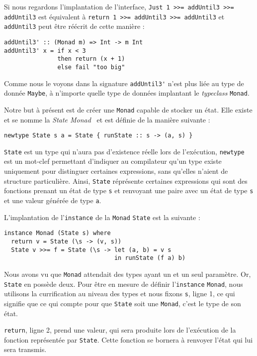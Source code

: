 \documentclass{llncs}
\begin{document}
Si nous regardons l'implantation de l'interface, \lstinline{Just 1 >>= addUntil3 >>= addUntil3}
est équivalent à \lstinline{return 1 >>= addUntil3 >>= addUntil3} et \lstinline{addUntil3}
peut être réécrit de cette manière :
\begin{lstlisting}
addUntil3' :: (Monad m) => Int -> m Int
addUntil3' x = if x < 3
               then return (x + 1)
               else fail "too big"
\end{lstlisting}

Comme nous le voyons dans la signature \lstinline{addUntil3'} n'est plus liée au type
de donnée \lstinline{Maybe}, à n'importe quelle type de données implantant le \emph{typeclass}
\lstinline{Monad}.

Notre but à présent est de créer une \lstinline{Monad} capable de stocker un état.
Elle existe et se nomme la \emph{State Monad}~\cite{PeytonJones95} et est définie de la manière
suivante :
\begin{lstlisting}
newtype State s a = State { runState :: s -> (a, s) }
\end{lstlisting}
\lstinline{State} est un type qui n'aura pas d'existence réelle lors de l'exécution,
\lstinline{newtype} est un mot-clef permettant d'indiquer au compilateur qu'un type
existe uniquement pour distinguer certaines expressions, sans qu'elles n'aient de
structure particulière.
Ainsi, \lstinline{State} réprésente certaines expressions qui sont des fonctions
prenant un état de type \lstinline{s} et renvoyant une paire avec un état
de type \lstinline{s} et une valeur générée de type \lstinline{a}.

L'implantation de l'\lstinline{instance} de la \lstinline{Monad} \lstinline{State}
est la suivante :
\begin{lstlisting}
instance Monad (State s) where
  return v = State (\s -> (v, s))
  State v >>= f = State (\s -> let (a, b) = v s
                               in runState (f a) b)
\end{lstlisting}

Nous avons vu que \lstinline{Monad} attendait des types ayant un et un seul paramètre.
Or, \lstinline{State} en possède deux.
Pour être en mesure de définir l'\lstinline{instance} \lstinline{Monad},
nous utilisons la currification au niveau des types et nous fixons \lstinline{s},
ligne 1, ce qui signifie que ce qui compte pour que \lstinline{State} soit une \lstinline{Monad},
c'est le type de son état.

\lstinline{return}, ligne 2, prend une valeur, qui sera produite lors de
l'exécution de la fonction représentée par \lstinline{State}.
Cette fonction se bornera à renvoyer l'état qui lui sera transmis.
\end{document}
